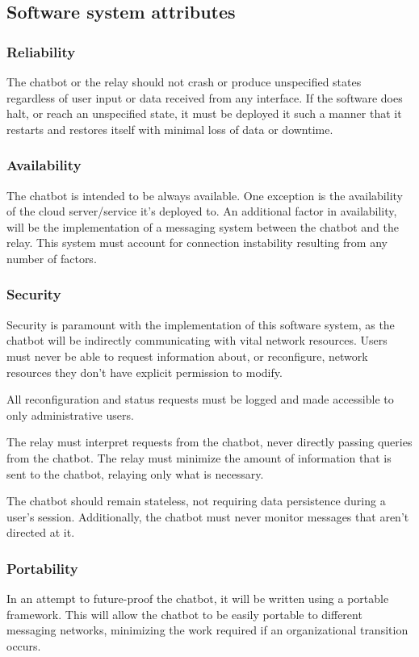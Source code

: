 \documentclass[onecolumn, draftclsnofoot,10pt, compsoc]{IEEEtran}
\begin{document}
\subsection{Software system attributes}

\subsubsection{Reliability}
The chatbot or the relay should not crash or produce unspecified states regardless of user input or data received from any interface. 
If the software does halt, or reach an unspecified state, it must be deployed it such a manner that it restarts and restores itself with minimal loss of data or downtime.

\subsubsection{Availability}
The chatbot is intended to be always available.
One exception is the availability of the cloud server/service it's deployed to.
An additional factor in availability, will be the implementation of a messaging system between the chatbot and the relay.
This system must account for connection instability resulting from any number of factors.

\subsubsection{Security}
Security is paramount with the implementation of this software system, as the chatbot will be indirectly communicating with vital network resources.
Users must never be able to request information about, or reconfigure, network resources they don't have explicit permission to modify.

All reconfiguration and status requests must be logged and made accessible to only administrative users.

The relay must interpret requests from the chatbot, never directly passing queries from the chatbot.
The relay must minimize the amount of information that is sent to the chatbot, relaying only what is necessary.

The chatbot should remain stateless, not requiring data persistence during a user's session.
Additionally, the chatbot must never monitor messages that aren't directed at it.

\subsubsection{Portability}
In an attempt to future-proof the chatbot, it will be written using a portable framework.
This will allow the chatbot to be easily portable to different messaging networks, minimizing the work required if an organizational transition occurs.
\end{document}
